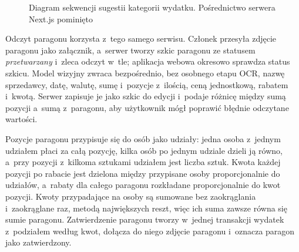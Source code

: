 \begin{figure}[H]
  \centering
  \caption{Diagram sekwencji sugestii kategorii wydatku. Pośrednictwo serwera Next.js pominięto}
  \label{fig:sekwencja-kategoria}
\end{figure}

Odczyt paragonu korzysta z~tego samego serwisu. Członek przesyła zdjęcie paragonu jako załącznik, a~serwer tworzy szkic paragonu ze statusem \emph{przetwarzany} i~zleca odczyt w~tle; aplikacja webowa okresowo sprawdza status szkicu. Model wizyjny zwraca bezpośrednio, bez osobnego etapu OCR, nazwę sprzedawcy, datę, walutę, sumę i~pozycje z~ilością, ceną jednostkową, rabatem i~kwotą. Serwer zapisuje je jako szkic do edycji i~podaje różnicę między sumą pozycji a~sumą z~paragonu, aby użytkownik mógł poprawić błędnie odczytane wartości.

Pozycje paragonu przypisuje się do osób jako udziały: jedna osoba z~jednym udziałem płaci za całą pozycję, kilka osób po jednym udziale dzieli ją równo, a~przy pozycji z~kilkoma sztukami udziałem jest liczba sztuk. Kwota każdej pozycji po rabacie jest dzielona między przypisane osoby proporcjonalnie do udziałów, a~rabaty dla całego paragonu rozkładane proporcjonalnie do kwot pozycji. Kwoty przypadające na osoby są sumowane bez zaokrąglania i~zaokrąglane raz, metodą największych reszt, więc ich suma zawsze równa się sumie paragonu. Zatwierdzenie paragonu tworzy w~jednej transakcji wydatek z~podziałem według kwot, dołącza do niego zdjęcie paragonu i~oznacza paragon jako zatwierdzony.

